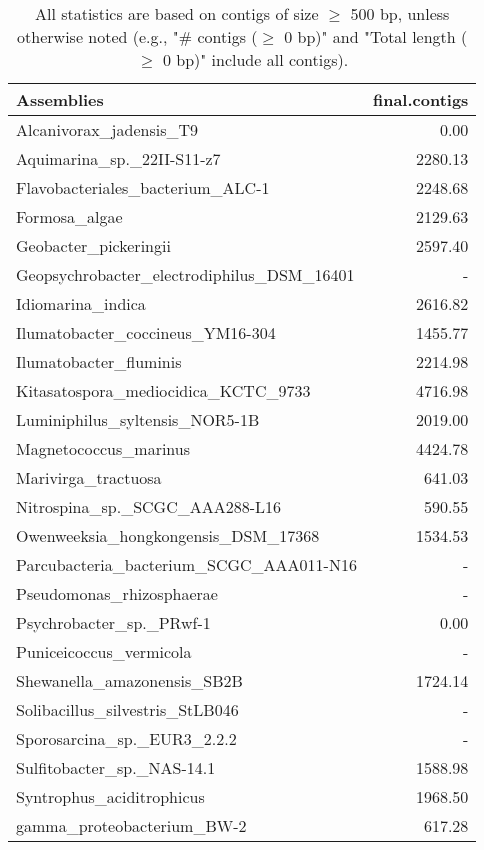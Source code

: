 \documentclass[12pt,a4paper]{article}
\begin{document}
\begin{table}[ht]
\begin{center}
\caption{All statistics are based on contigs of size $\geq$ 500 bp, unless otherwise noted (e.g., "\# contigs ($\geq$ 0 bp)" and "Total length ($\geq$ 0 bp)" include all contigs).}
\begin{tabular}{|l*{1}{|r}|}
\hline
Assemblies & final.contigs \\ \hline
Alcanivorax\_jadensis\_T9 & 0.00 \\ \hline
Aquimarina\_sp.\_22II-S11-z7 & 2280.13 \\ \hline
Flavobacteriales\_bacterium\_ALC-1 & 2248.68 \\ \hline
Formosa\_algae & 2129.63 \\ \hline
Geobacter\_pickeringii & 2597.40 \\ \hline
Geopsychrobacter\_electrodiphilus\_DSM\_16401 & - \\ \hline
Idiomarina\_indica & 2616.82 \\ \hline
Ilumatobacter\_coccineus\_YM16-304 & 1455.77 \\ \hline
Ilumatobacter\_fluminis & 2214.98 \\ \hline
Kitasatospora\_mediocidica\_KCTC\_9733 & 4716.98 \\ \hline
Luminiphilus\_syltensis\_NOR5-1B & 2019.00 \\ \hline
Magnetococcus\_marinus & 4424.78 \\ \hline
Marivirga\_tractuosa & 641.03 \\ \hline
Nitrospina\_sp.\_SCGC\_AAA288-L16 & 590.55 \\ \hline
Owenweeksia\_hongkongensis\_DSM\_17368 & 1534.53 \\ \hline
Parcubacteria\_bacterium\_SCGC\_AAA011-N16 & - \\ \hline
Pseudomonas\_rhizosphaerae & - \\ \hline
Psychrobacter\_sp.\_PRwf-1 & 0.00 \\ \hline
Puniceicoccus\_vermicola & - \\ \hline
Shewanella\_amazonensis\_SB2B & 1724.14 \\ \hline
Solibacillus\_silvestris\_StLB046 & - \\ \hline
Sporosarcina\_sp.\_EUR3\_2.2.2 & - \\ \hline
Sulfitobacter\_sp.\_NAS-14.1 & 1588.98 \\ \hline
Syntrophus\_aciditrophicus & 1968.50 \\ \hline
gamma\_proteobacterium\_BW-2 & 617.28 \\ \hline
\end{tabular}
\end{center}
\end{table}
\end{document}
